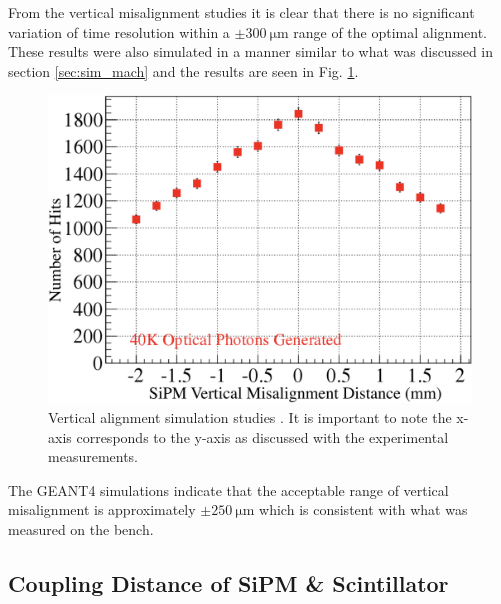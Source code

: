 From the vertical misalignment studies it is clear that there is no significant variation of time resolution within a $\pm 300\ \mathrm{\mu m}$ range of the optimal alignment.  These results were also simulated in a manner similar to what was discussed in section \ref{sec:sim_mach} and the results are seen in Fig. \ref{fig:vertical_sim}.
\begin{figure}[!htb]
	\centering
	\includegraphics[width=1.0\columnwidth]{misalignment/figs/vertical_sim}
	\caption{Vertical alignment simulation studies \cite{puneet_sim_talk}.  It is important to note the x-axis corresponds to the y-axis as discussed with the experimental measurements.}
	\label{fig:vertical_sim}
\end{figure}
The GEANT4 simulations indicate that the acceptable range of vertical misalignment is approximately $\pm 250\ \mathrm{\mu m}$ \cite{puneet_sim_talk} which is consistent with what was measured on the bench.

\subsection{Coupling Distance of SiPM \& Scintillator}

